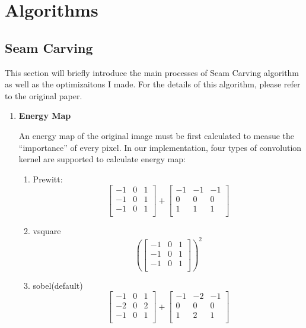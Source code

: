 
\section{Algorithms}

\subsection{Seam Carving}
This section will briefly introduce the main processes of Seam Carving algorithm
as well as the optimizaitons I made.
For the details of this algorithm, please refer to the original paper\cite{sc}.

\begin{enumerate}
    \item \textbf{Energy Map}

      An energy map of the original image must be first calculated to
      measue the ``importance'' of every pixel.
      In our implementation, four types of convolution kernel
      are supported to calculate energy map:

\begin{enumerate}
    \item Prewitt:
      \[ \begin{bmatrix}
          -1 & 0 & 1\\
          -1 & 0 & 1 \\
          -1 & 0 & 1\\
        \end{bmatrix} +
      \begin{bmatrix}
          -1 & -1 & -1\\
          0 & 0 & 0 \\
          1 & 1 & 1\\
        \end{bmatrix} \]

        \item vsquare
      \[ (\begin{bmatrix}
          -1 & 0 & 1\\
          -1 & 0 & 1 \\
          -1 & 0 & 1\\
        \end{bmatrix})^2 \]

      \item sobel(default)
      \[ \begin{bmatrix}
          -1 & 0 & 1\\
          -2 & 0 & 2 \\
          -1 & 0 & 1\\
        \end{bmatrix} +
      \begin{bmatrix}
          -1 & -2 & -1\\
          0 & 0 & 0 \\
          1 & 2 & 1\\
        \end{bmatrix} \]


\end{enumerate}
\end{enumerate}
